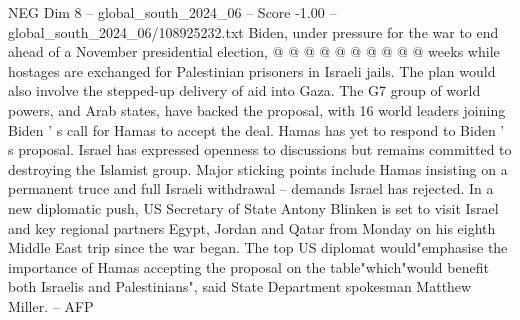 \begin{textsample}{NEG Dim 8 – global\_south\_2024\_06 – Score -1.00 – global\_south\_2024\_06/108925232.txt}
Biden, under pressure for the war to end ahead of a November presidential election, @ @ @ @ @ @ @ @ @ @ weeks while hostages are exchanged for Palestinian prisoners in Israeli jails.
The plan would also involve the stepped-up delivery of aid into Gaza.
The G7 group of world powers, and Arab states, have backed the proposal, with 16 world leaders joining Biden ' s call for Hamas to accept the deal.
Hamas has yet to respond to Biden ' s proposal.
Israel has expressed openness to discussions but remains committed to destroying the Islamist group.
Major sticking points include Hamas insisting on a permanent truce and full Israeli withdrawal -- demands Israel has rejected.
In a new diplomatic push, US Secretary of State Antony Blinken is set to visit Israel and key regional partners Egypt, Jordan and Qatar from Monday on his eighth Middle East trip since the war began.
The top US diplomat would"emphasise the importance of Hamas accepting the proposal on the table"which"would benefit both Israelis and Palestinians", said State Department spokesman Matthew Miller. -- AFP

\end{textsample}
